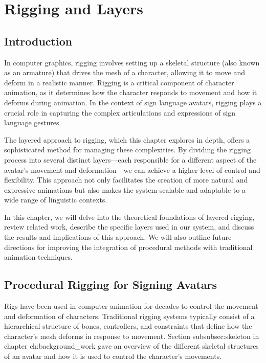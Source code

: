 \documentclass[../../main.tex]{subfiles}
\begin{document}
\chapter{Rigging and Layers}
\label{ch:rigging_layers}

\section{Introduction}
In computer graphics, rigging involves setting up a skeletal structure (also known as an armature) that drives the mesh of a character, allowing it to move and deform in a realistic manner. Rigging is a critical component of character animation, as it determines how the character responds to movement and how it deforms during animation. In the context of sign language avatars, rigging plays a crucial role in capturing the complex articulations and expressions of sign language gestures.

The layered approach to rigging, which this chapter explores in depth, offers a sophisticated method for managing these complexities. By dividing the rigging process into several distinct layers—each responsible for a different aspect of the avatar’s movement and deformation—we can achieve a higher level of control and flexibility. This approach not only facilitates the creation of more natural and expressive animations but also makes the system scalable and adaptable to a wide range of linguistic contexts.

In this chapter, we will delve into the theoretical foundations of layered rigging, review related work, describe the specific layers used in our system, and discuss the results and implications of this approach. We will also outline future directions for improving the integration of procedural methods with traditional animation techniques.

\section{Procedural Rigging for Signing Avatars}

Rigs have been used in computer animation for decades to control the movement and deformation of characters. Traditional rigging systems typically consist of a hierarchical structure of bones, controllers, and constraints that define how the character’s mesh deforms in response to movement. Section {subsubsec:skeleton} in chapter {ch:background_work} gave an overview of the different skeletal structures of an avatar and how it is used to control the character’s movements.
\end{document}
